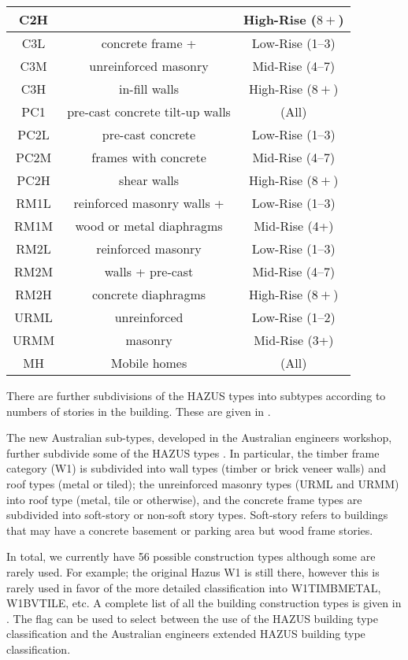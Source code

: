 \begin{table}
\begin{tabular}{|c|c|c|}
C2H & & High-Rise ($8+$)\\
\hline
C3L & concrete frame + & Low-Rise (1--3)\\
C3M & unreinforced masonry & Mid-Rise (4--7)\\
C3H & in-fill walls & High-Rise ($8+$)\\
\hline
PC1 & pre-cast concrete tilt-up walls & (All)\\
\hline
PC2L & pre-cast concrete  & Low-Rise (1--3)\\
PC2M &  frames with concrete  & Mid-Rise (4--7)\\
PC2H & shear walls & High-Rise ($8+$)\\
\hline
RM1L & reinforced masonry walls + & Low-Rise (1--3)\\
RM1M & wood or metal diaphragms  & Mid-Rise (4+)\\
\hline
RM2L & reinforced masonry & Low-Rise (1--3)\\
RM2M & walls + pre-cast & Mid-Rise (4--7)\\
RM2H & concrete diaphragms & High-Rise ($8+$)\\
\hline
URML & unreinforced & Low-Rise (1--2)\\
URMM & masonry & Mid-Rise (3+)\\
\hline
MH & Mobile homes & (All)\\
  \hline
\end{tabular}
\end{table}
There are further subdivisions of the HAZUS types into subtypes
according to numbers of stories in the building. These are given
in .

The new Australian sub-types, developed in the Australian
engineers workshop, further subdivide some of the HAZUS types
\citep{dr_Stehle01a}. In particular, the timber frame category
(W1) is subdivided into wall types (timber or brick veneer walls)
and roof types (metal or tiled); the unreinforced masonry types
(URML and URMM) into roof type (metal, tile or  otherwise), and
the concrete frame types are subdivided into soft-story or
non-soft story types. Soft-story refers to buildings that may have
a concrete basement or parking area but wood frame stories.

In total, we currently have 56 possible construction types
although some are rarely used. For example; the original Hazus W1
is still there, however this is rarely used in favor of the more
detailed classification into W1TIMBMETAL, W1BVTILE, etc. A
complete list of all the building construction types is given in
. The  flag
 can be used to select between
the use of the HAZUS building type
classification and the Australian engineers extended HAZUS
building type classification.

